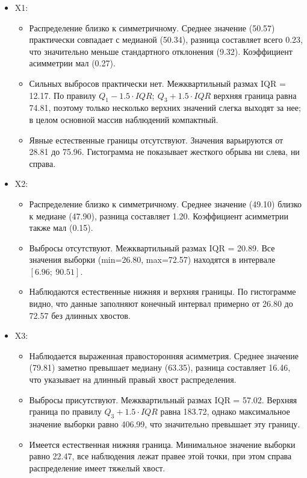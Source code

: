 \documentclass[11pt]{article}
\providecommand{\tightlist}{%
      \setlength{\itemsep}{0pt}\setlength{\parskip}{0pt}}
\begin{document}
\begin{itemize}
\tightlist
\item
  X1:

  \begin{itemize}
  \tightlist
  \item
    Распределение близко к симметричному. Среднее значение (50.57)
    практически совпадает с медианой (50.34), разница составляет всего
    0.23, что значительно меньше стандартного отклонения (9.32).
    Коэффициент асимметрии мал (0.27).
  \item
    Сильных выбросов практически нет. Межквартильный размах IQR = 12.17.
    По правилу \(Q_1 - 1.5 \cdot IQR;\ Q_3 + 1.5 \cdot IQR\) верхняя
    граница равна 74.81, поэтому только несколько верхних значений
    слегка выходят за нее; в целом основной массив наблюдений
    компактный.
  \item
    Явные естественные границы отсутствуют. Значения варьируются от
    28.81 до 75.96. Гистограмма не показывает жесткого обрыва ни слева,
    ни справа.
  \end{itemize}
\item
  X2:

  \begin{itemize}
  \tightlist
  \item
    Распределение близко к симметричному. Среднее значение (49.10)
    близко к медиане (47.90), разница составляет 1.20. Коэффициент
    асимметрии также мал (0.15).
  \item
    Выбросы отсутствуют. Межквартильный размах IQR = 20.89. Все значения
    выборки (min=26.80, max=72.57) находятся в интервале
    \([6.96;\ 90.51]\).
  \item
    Наблюдаются естественные нижняя и верхняя границы. По гистограмме
    видно, что данные заполняют конечный интервал примерно от 26.80 до
    72.57 без длинных хвостов.
  \end{itemize}
\item
  X3:

  \begin{itemize}
  \tightlist
  \item
    Наблюдается выраженная правосторонняя асимметрия. Среднее значение
    (79.81) заметно превышает медиану (63.35), разница составляет 16.46,
    что указывает на длинный правый хвост распределения.
  \item
    Выбросы присутствуют. Межквартильный размах IQR = 57.02. Верхняя
    граница по правилу \(Q_3 + 1.5 \cdot IQR\) равна 183.72, однако
    максимальное значение выборки равно 406.99, что значительно
    превышает эту границу.
  \item
    Имеется естественная нижняя граница. Минимальное значение выборки
    равно 22.47, все наблюдения лежат правее этой точки, при этом справа
    распределение имеет тяжелый хвост.
  \end{itemize}
\end{itemize}
\end{document}
